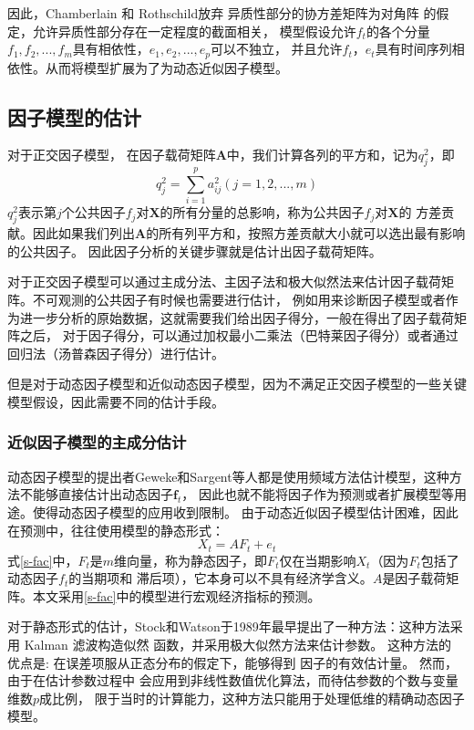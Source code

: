 因此，Chamberlain 和 Rothschild放弃 异质性部分的协方差矩阵为对角阵 的假定，允许异质性部分存在一定程度的截面相关， 
模型假设允许$f_t$的各个分量$f_1, f_2, ..., f_m$具有相依性，$e_1, e_2, ..., e_p$可以不独立，
并且允许$f_t$，$e_t$具有时间序列相依性。从而将模型扩展为了为动态近似因子模型。

\subsection{因子模型的估计}
对于正交因子模型，
在因子载荷矩阵$\bm{A}$中，我们计算各列的平方和，记为$q_j^2$，即
\begin{equation}
    q_j^2 = \sum_{i=1}^p a_{ij}^2 (j = 1, 2, ..., m)
\end{equation}
$q_j^2$表示第$j$个公共因子$f_j$对$\bm{X}$的所有分量的总影响，称为公共因子$f_j$对$\bm{X}$的
方差贡献。因此如果我们列出$\bm{A}$的所有列平方和，按照方差贡献大小就可以选出最有影响的公共因子。
因此因子分析的关键步骤就是估计出因子载荷矩阵。

对于正交因子模型可以通过主成分法、主因子法和极大似然法来估计因子载荷矩阵。不可观测的公共因子有时候也需要进行估计，
例如用来诊断因子模型或者作为进一步分析的原始数据，这就需要我们给出因子得分，一般在得出了因子载荷矩阵之后，
对于因子得分，可以通过加权最小二乘法（巴特莱因子得分）或者通过回归法（汤普森因子得分）进行估计。

但是对于动态因子模型和近似动态因子模型，因为不满足正交因子模型的一些关键模型假设，因此需要不同的估计手段。

\subsubsection{近似因子模型的主成分估计}
动态因子模型的提出者Geweke和Sargent等人都是使用频域方法估计模型，这种方法不能够直接估计出动态因子$\bm{f}_t$，
因此也就不能将因子作为预测或者扩展模型等用途。使得动态因子模型的应用收到限制。
由于动态近似因子模型估计困难，因此在预测中，往往使用模型的静态形式：
\begin{equation}\label{s-fac}
X_t = AF_t + e_t
\end{equation}
式\eqref{s-fac}中，$F_t$是$m$维向量，称为静态因子，即$F_t$仅在当期影响$X_t$（因为$F_t$包括了动态因子$f_t$的当期项和
滞后项），它本身可以不具有经济学含义。$A$是因子载荷矩阵。本文采用\eqref{s-fac}中的模型进行宏观经济指标的预测。

对于静态形式的估计，Stock和Watson于1989年最早提出了一种方法：这种方法采用
Kalman 滤波构造似然 函数，并采用极大似然方法来估计参数。
这种方法的 优点是: 在误差项服从正态分布的假定下，能够得到 因子的有效估计量。
然而，由于在估计参数过程中 会应用到非线性数值优化算法，而待估参数的个数与变量维数$p$成比例，
限于当时的计算能力，这种方法只能用于处理低维的精确动态因子模型。

